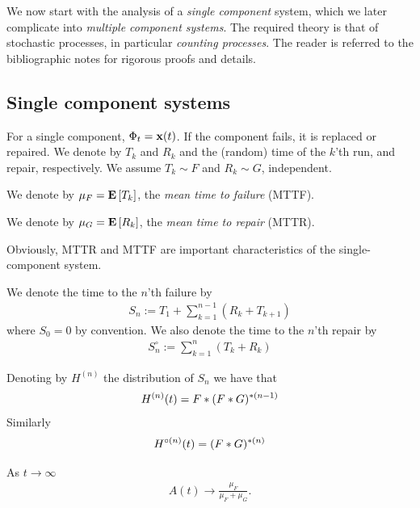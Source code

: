 We now start with the analysis of a \emph{single component} system, which we later complicate into \emph{multiple component systems}. 
The required theory is that of stochastic processes, in particular \emph{counting processes}. 
The reader is referred to the bibliographic notes for rigorous proofs and details. 

\subsection{Single component systems}
For a single component, $\Phi_t=\mathbf{x}(t)$. 
If the component fails, it is replaced or repaired. 
We denote by $T_k$ and $R_k$ and the (random) time of the $k$'th run, and repair, respectively.
We assume $T_k \sim F$ and $R_k \sim G$, independent.

\begin{definition}[MTTF]
We denote by $\mu_F=\mathbf{E}\left[ T_k \right]$, the \emph{mean time to failure} (MTTF).
\end{definition}


\begin{definition}[MTTR]
We denote by $\mu_G=\mathbf{E}\left[ R_k \right]$, the \emph{mean time to repair} (MTTR).
\end{definition}

Obviously, MTTR and MTTF are important characteristics of the single-component system.

We denote the time to the $n$'th failure by 
\begin{align}
	S_n:= T_1 + \sum_{k=1}^{n-1} (R_k+T_{k+1})
\end{align}
where $S_0=0$ by convention.
We also denote the time to the $n$'th repair by 
\begin{align}
	S^\circ_n:= \sum_{k=1}^{n} (T_k+R_k)
\end{align}

Denoting by $H^{(n)}$ the distribution of $S_n$ we have that 
\begin{align}
	H^{(n)}(t)= F \ast (F \ast G)^{\ast (n-1)}
\end{align}
Similarly
\begin{align}
	H^{\circ(n)}(t)= (F \ast G)^{\ast (n)}
\end{align}

\begin{theorem}
As $t \to \infty$
\begin{align}
	A(t) \to \frac{\mu_F}{\mu_F+\mu_G}.
\end{align}
\end{theorem}

